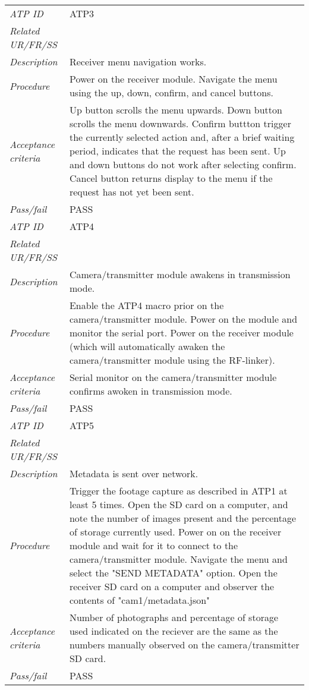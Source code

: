 \documentclass[class=report,11pt,crop=false]{standalone}
\begin{document}
\begin{table}[!ht]
\begin{scriptsize}
\begin{tabularx}{\textwidth}{|p{} X|}
        \textit{ATP ID} & ATP3\\
        \textit{Related UR/FR/SS} &\\
        \textit{Description} & Receiver menu navigation works.\\
        \textit{Procedure} & Power on the receiver module. Navigate the menu using the up, down, confirm, and cancel buttons.\\
        \textit{Acceptance criteria} & Up button scrolls the menu upwards. Down button scrolls the menu downwards. Confirm buttton trigger the currently selected action and, after a brief waiting period, indicates that the request has been sent. Up and down buttons do not work after selecting confirm. Cancel button returns display to the menu if the request has not yet been sent.\\ 
        \textit{Pass/fail} & PASS \\ \hline

        \textit{ATP ID} & ATP4 \\
        \textit{Related UR/FR/SS} & \\
        \textit{Description} & Camera/transmitter module awakens in transmission mode. \\
        \textit{Procedure} &  Enable the ATP4 macro prior on the camera/transmitter module. Power on the module and monitor the serial port. Power on the receiver module (which will automatically awaken the camera/transmitter module using the RF-linker).\\
        \textit{Acceptance criteria} & Serial monitor on the camera/transmitter module confirms awoken in transmission mode.\\ 
        \textit{Pass/fail} & PASS\\ \hline

        \textit{ATP ID} & ATP5  \\
        \textit{Related UR/FR/SS} &\\
        \textit{Description} & Metadata is sent over network.\\
        \textit{Procedure} & Trigger the footage capture as described in ATP1 at least 5 times. Open the SD card on a computer, and note the number of images present and the percentage of storage currently used. Power on on the receiver module and wait for it to connect to the camera/transmitter module. Navigate the menu and select the "SEND METADATA" option. Open the receiver SD card on a computer and observer the contents of "cam1/metadata.json"\\
        \textit{Acceptance criteria} & Number of photographs and percentage of storage used indicated on the reciever are the same as the numbers manually observed on the camera/transmitter SD card. \\ 
        \textit{Pass/fail} & PASS\\ \hline


\end{tabularx}
\end{scriptsize}
\end{table}
\end{document}
